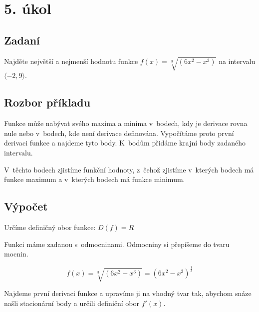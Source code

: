 \section{5. úkol}
\subsection{Zadaní}
 Najděte největší a nejmenší hodnotu funkce $f(x)=\sqrt[3]{(6x^2-x^3)} $ na intervalu $ \langle-2,9\rangle$.

\subsection{Rozbor příkladu}
Funkce může nabývat svého maxima a minima v~bodech, kdy je derivace rovna nule nebo v~bodech, kde není derivace definována. Vypočítáme proto první derivaci funkce a najdeme tyto body. K~bodům přidáme krajní body zadaného intervalu.

V~těchto bodech zjistíme funkční hodnoty, z~čehož zjistíme v~kterých bodech má funkce maximum a v~kterých bodech má funkce minimum.
\subsection{Výpočet}
Určíme definičný obor funkce: $D(f)=R$

Funkci máme zadanou s~odmocninami. Odmocniny si přepíšeme do tvaru mocnin.

\begin{displaymath}
f(x)=\sqrt[3]{(6x^2-x^3)}=(6x^2-x^3)^\frac{1}{3}
\end{displaymath}

Najdeme první derivaci funkce a upravíme ji na vhodný tvar tak, abychom snáze našli stacionární body a určili definiční obor $f'(x)$.

